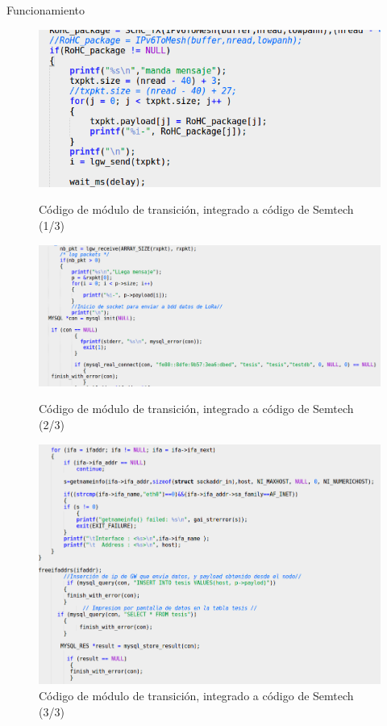 \documentclass[10pt]{beamer}
\begin{document}
\begin{frame}[fragile]{Funcionamiento}
\begin{figure}
\begin{overprint}
\centering\includegraphics[scale=0.5]{imagenes/codigo1}\caption{Código de módulo de transición, integrado a código de Semtech (1/3)}
\centering\includegraphics[scale=0.3]{imagenes/codigo2}\caption{Código de módulo de transición, integrado a código de Semtech (2/3)}
\centering\includegraphics[scale=0.3]{imagenes/codigo3}\caption{Código de módulo de transición, integrado a código de Semtech (3/3)}
\end{overprint}
\end{figure}
\end{frame}
\end{document}
